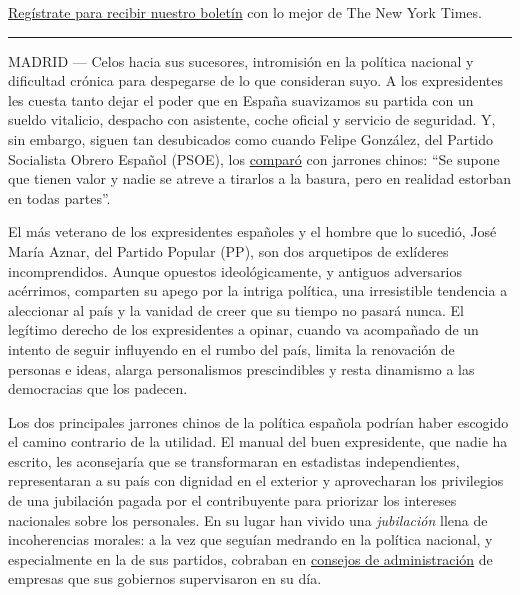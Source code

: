 \href{https://www.nytimes.com/newsletters/el-times}{Regístrate para
recibir nuestro boletín} con lo mejor de The New York Times.

\begin{center}\rule{0.5\linewidth}{\linethickness}\end{center}

MADRID --- Celos hacia sus sucesores, intromisión en la política
nacional y dificultad crónica para despegarse de lo que consideran suyo.
A los expresidentes les cuesta tanto dejar el poder que en España
suavizamos su partida con un sueldo vitalicio, despacho con asistente,
coche oficial y servicio de seguridad. Y, sin embargo, siguen tan
desubicados como cuando Felipe González, del Partido Socialista Obrero
Español (PSOE), los
\href{https://www.lavozdegalicia.es/noticia/espana/2016/06/03/dos-jarrones-chinos-estorban-partidos-suman-votos/0003_201606G3P18993.htm}{comparó}
con jarrones chinos: ``Se supone que tienen valor y nadie se atreve a
tirarlos a la basura, pero en realidad estorban en todas partes''.

El más veterano de los expresidentes españoles y el hombre que lo
sucedió, José María Aznar, del Partido Popular (PP), son dos arquetipos
de exlíderes incomprendidos. Aunque opuestos ideológicamente, y antiguos
adversarios acérrimos, comparten su apego por la intriga política, una
irresistible tendencia a aleccionar al país y la vanidad de creer que su
tiempo no pasará nunca. El legítimo derecho de los expresidentes a
opinar, cuando va acompañado de un intento de seguir influyendo en el
rumbo del país, limita la renovación de personas e ideas, alarga
personalismos prescindibles y resta dinamismo a las democracias que los
padecen.

Los dos principales jarrones chinos de la política española podrían
haber escogido el camino contrario de la utilidad. El manual del buen
expresidente, que nadie ha escrito, les aconsejaría que se transformaran
en estadistas independientes, representaran a su país con dignidad en el
exterior y aprovecharan los privilegios de una jubilación pagada por el
contribuyente para priorizar los intereses nacionales sobre los
personales. En su lugar han vivido una \emph{jubilación} llena de
incoherencias morales: a la vez que seguían medrando en la política
nacional, y especialmente en la de sus partidos, cobraban en
\href{https://www.abc.es/espana/20150729/abci-trabajos-presidentes-espana-zapatero-201507281742.html}{consejos
de administración} de empresas que sus gobiernos supervisaron en su día.

